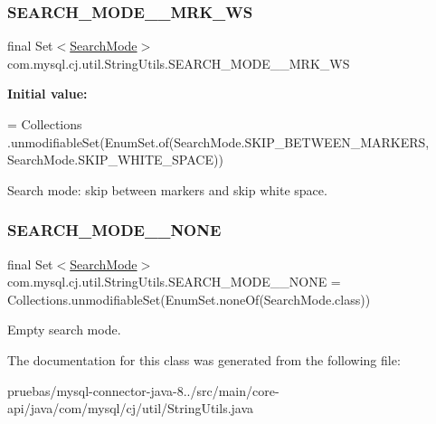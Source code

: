 \subsubsection{\texorpdfstring{S\+E\+A\+R\+C\+H\+\_\+\+M\+O\+D\+E\+\_\+\+\_\+\+M\+R\+K\+\_\+\+WS}{SEARCH\_MODE\_\_MRK\_WS}}
{\footnotesize\ttfamily final Set$<$\mbox{\hyperlink{enumcom_1_1mysql_1_1cj_1_1util_1_1_string_utils_1_1_search_mode}{Search\+Mode}}$>$ com.\+mysql.\+cj.\+util.\+String\+Utils.\+S\+E\+A\+R\+C\+H\+\_\+\+M\+O\+D\+E\+\_\+\+\_\+\+M\+R\+K\+\_\+\+WS\hspace{0.3cm}{\ttfamily [static]}}

{\bfseries Initial value\+:}
\begin{DoxyCode}
= Collections
            .unmodifiableSet(EnumSet.of(SearchMode.SKIP\_BETWEEN\_MARKERS, SearchMode.SKIP\_WHITE\_SPACE))
\end{DoxyCode}
Search mode\+: skip between markers and skip white space. \mbox{\label{classcom_1_1mysql_1_1cj_1_1util_1_1_string_utils_a96bd30b71e422236854638c4d47c8c63}} 
\subsubsection{\texorpdfstring{S\+E\+A\+R\+C\+H\+\_\+\+M\+O\+D\+E\+\_\+\+\_\+\+N\+O\+NE}{SEARCH\_MODE\_\_NONE}}
{\footnotesize\ttfamily final Set$<$\mbox{\hyperlink{enumcom_1_1mysql_1_1cj_1_1util_1_1_string_utils_1_1_search_mode}{Search\+Mode}}$>$ com.\+mysql.\+cj.\+util.\+String\+Utils.\+S\+E\+A\+R\+C\+H\+\_\+\+M\+O\+D\+E\+\_\+\+\_\+\+N\+O\+NE = Collections.\+unmodifiable\+Set(Enum\+Set.\+none\+Of(Search\+Mode.\+class))\hspace{0.3cm}{\ttfamily [static]}}

Empty search mode. 

The documentation for this class was generated from the following file\+:\begin{DoxyCompactItemize}
\item 
pruebas/mysql-\/connector-\/java-\/8../src/main/core-\/api/java/com/mysql/cj/util/String\+Utils.\+java\end{DoxyCompactItemize}
